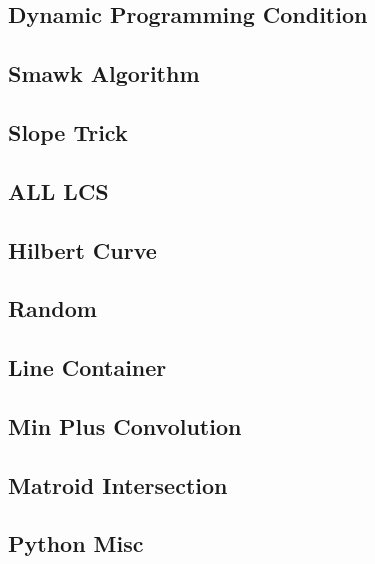 \subsection{Dynamic Programming Condition}

\subsection{Smawk Algorithm}

\subsection{Slope Trick}

% 
% 
\subsection{ALL LCS}

\subsection{Hilbert Curve}

\subsection{Random}

\subsection{Line Container}

\subsection{Min Plus Convolution}

% 
\subsection{Matroid Intersection}

\subsection{Python Misc}

